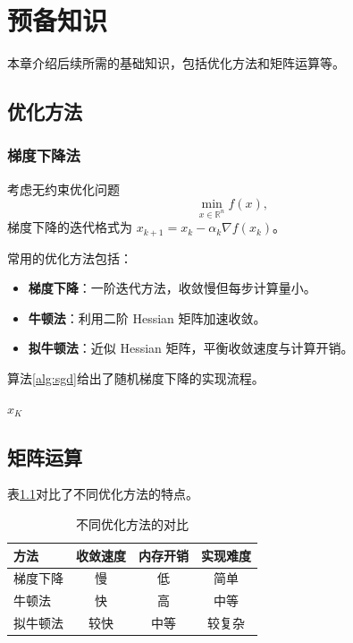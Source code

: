 %
%
%

\chapter{预备知识}
\label{chap:preliminaries}

本章介绍后续所需的基础知识，包括优化方法和矩阵运算等。

\section{优化方法}
\label{sec:optimization}

\subsection{梯度下降法}
\label{subsec:gd}

考虑无约束优化问题
\begin{equation}
\min_{x \in \mathbb{R}^n} f(x),
\label{eq:opt_prob}
\end{equation}
梯度下降的迭代格式为 \(x_{k+1} = x_k - \alpha_k \nabla f(x_k)\)。

常用的优化方法包括：
\begin{itemize}
\item \textbf{梯度下降}：一阶迭代方法，收敛慢但每步计算量小。
\item \textbf{牛顿法}：利用二阶 Hessian 矩阵加速收敛。
\item \textbf{拟牛顿法}：近似 Hessian 矩阵，平衡收敛速度与计算开销。
\end{itemize}

算法\ref{alg:sgd}给出了随机梯度下降的实现流程。

\begin{algorithm}[htbp]
\caption{随机梯度下降（SGD）}
\label{alg:sgd}
\SetAlgoLined
{}
\Return \(x_K\)\;
\end{algorithm}

\section{矩阵运算}
\label{sec:matrix}

表\ref{tab:methods}对比了不同优化方法的特点。

\begin{table}[htbp]
\centering
\caption{不同优化方法的对比}
\label{tab:methods}
\begin{tabular}{lccc}
\toprule
方法 & 收敛速度 & 内存开销 & 实现难度 \\
\midrule
梯度下降 & 慢 & 低 & 简单 \\
牛顿法 & 快 & 高 & 中等 \\
拟牛顿法 & 较快 & 中等 & 较复杂 \\
\bottomrule
\end{tabular}
\end{table}
